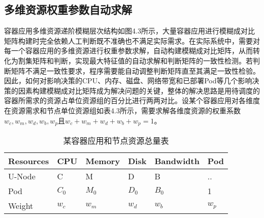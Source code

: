 \subsection{多维资源权重参数自动求解}
容器应用多维资源递阶模糊层次结构如图4.3所示，大量容器应用进行模糊成对比矩阵构建时完全依赖人工判断既不准确也不满足实际需求。在实际系统中，需要对每一个容器应用的多维资源进行权重参数求解，自动构建模糊成对比矩阵，从而转化为割集矩阵和判断，实现最大特征值的自动求解和判断矩阵的一致性检测。若判断矩阵不满足一致性要求，程序需要能自动调整判断矩阵直至其满足一致性检验。因此，如何对影响决策的CPU、内存、磁盘、网络带宽和已部署Pod等几个影响决策的因素构建模糊成对比矩阵成为解决问题的关键，整体的解决思路是用待调度的容器所需求的资源占单位资源组的百分比进行两两对比。设某个容器应用对各维度在资源需求和节点单位资源组如表4.3所示，需要求解各维度资源的权重系数$w_{c},w_{m},w_{d},w_{b},w_{p}$且$w_{c}+w_{m}+w_{d}+w_{b}+w_{p}=1$。
\begin{table}[htbp]
	\centering\dawu[1.3]
	\caption{某容器应用和节点资源总量表}
		\begin{tabular}{|p{1.5cm}<{\centering}|p{1.5cm}<{\centering}|p{1.5cm}<{\centering}|p{1.5cm}<{\centering}|p{1.8cm}<{\centering}|p{1.5cm}<{\centering}|} \hline
			Resources & CPU & Memory & Disk & Bandwidth & Pod \\ \hline
			U-Node & C & M & D & B & ..  \\ \hline
			Pod & $C_{0}$ & $M_{0}$ & $D_{0}$ & $B_{0}$ & 1  \\ \hline
			Weight & $w_{c}$ & $w_{m}$ & $w_{d}$ & $w_{b}$ & $w_{p}$ \\ \hline
		\end{tabular}
\end{table}

